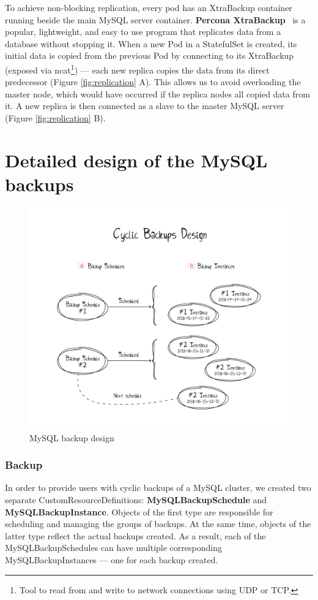 To achieve non-blocking replication, every pod has an XtraBackup
container running beside the main MySQL server container.  \textbf{Percona XtraBackup}~\cite{percona}
is a popular, lightweight, and easy to use program that replicates data from a database without
stopping it. When a new Pod in a StatefulSet is created, its initial data is copied from the
previous Pod by connecting to its XtraBackup (exposed via ncat\footnote{Tool to read from and
write to network connections using UDP or TCP.}) --- each new replica copies the data from its direct
predecessor (Figure \ref{fig:replication} A). This allows us to avoid overloading the master node,
which would have occurred if the replica nodes all copied data from it. A new replica is then connected
as a slave to the master MySQL server (Figure \ref{fig:replication} B).

\section{Detailed design of the MySQL backups}

\begin{figure}[!ht]
    \centering
    \includegraphics[width=1\textwidth, angle=0]{img/Backups.pdf}
    \caption{MySQL backup design}
    \label{fig:backups}
\end{figure}

\subsubsection*{Backup}
In order to provide users with cyclic backups of a MySQL cluster, we created
two separate CustomResourceDefinitions: \textbf{MySQLBackupSchedule} and
\textbf{MySQLBackupInstance}. Objects of the first type are responsible for
scheduling and managing the groups of backups. At the same time, objects
of the latter type reflect the actual backups created. As a result, each
of the MySQLBackupSchedules can have multiple corresponding
MySQLBackupInstances --- one for each backup created.

